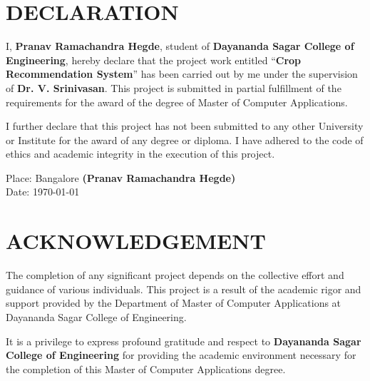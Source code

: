 \documentclass[12pt,a4paper]{report}
\begin{document}
\newpage

\chapter*{DECLARATION}
\label{ch:declaration} %

I, \textbf{Pranav Ramachandra Hegde}, student of \textbf{Dayananda Sagar College of Engineering}, hereby declare that the project work entitled ``\textbf{Crop Recommendation System}'' has been carried out by me under the supervision of \textbf{Dr. V. Srinivasan}. This project is submitted in partial fulfillment of the requirements for the award of the degree of Master of Computer Applications.

I further declare that this project has not been submitted to any other University or Institute for the award of any degree or diploma. I have adhered to the code of ethics and academic integrity in the execution of this project.

\vspace{3cm}
\noindent Place: Bangalore \hfill \textbf{(Pranav Ramachandra Hegde)} \\
Date: \today

\newpage

\chapter*{ACKNOWLEDGEMENT}
\label{ch:acknowledgement} %

The completion of any significant project depends on the collective effort and guidance of various individuals. This project is a result of the academic rigor and support provided by the Department of Master of Computer Applications at Dayananda Sagar College of Engineering.

It is a privilege to express profound gratitude and respect to \textbf{Dayananda Sagar College of Engineering} for providing the academic environment necessary for the completion of this Master of Computer Applications degree.
\end{document}
